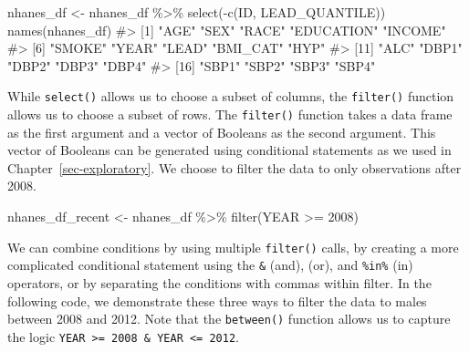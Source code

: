 \documentclass[
  letterpaper,
]{latex/krantz}
\makeatletter
\newenvironment{Shaded}{\begin{snugshade}}{\end{snugshade}}
\newcommand{\CommentTok}[1]{\textcolor[rgb]{0.37,0.37,0.37}{#1}}
\newcommand{\DecValTok}[1]{\textcolor[rgb]{0.68,0.00,0.00}{#1}}
\newcommand{\FunctionTok}[1]{\textcolor[rgb]{0.28,0.35,0.67}{#1}}
\newcommand{\NormalTok}[1]{\textcolor[rgb]{0.00,0.23,0.31}{#1}}
\newcommand{\OtherTok}[1]{\textcolor[rgb]{0.00,0.23,0.31}{#1}}
\newcommand{\SpecialCharTok}[1]{\textcolor[rgb]{0.37,0.37,0.37}{#1}}
\newenvironment{kframe}{%
\medskip{}
\setlength{\fboxsep}{.8em}
 \def\at@end@of@kframe{}%
 \ifinner\ifhmode%
  \def\at@end@of@kframe{\end{minipage}}%
  \begin{minipage}{\columnwidth}%
 \fi\fi%
 \def\FrameCommand##1{\hskip\@totalleftmargin \hskip-\fboxsep
 \colorbox{shadecolor}{##1}\hskip-\fboxsep
     \hskip-\linewidth \hskip-\@totalleftmargin \hskip\columnwidth}%
 \MakeFramed {\advance\hsize-\width
   \@totalleftmargin\z@ \linewidth\hsize
   \@setminipage}}%
 {\par\unskip\endMakeFramed%
 \at@end@of@kframe}
\renewenvironment{Shaded}{\begin{kframe}}{\end{kframe}}
\makeatother
\begin{document}
\begin{Shaded}
\begin{Highlighting}[]
\NormalTok{nhanes\_df }\OtherTok{\textless{}{-}}\NormalTok{ nhanes\_df }\SpecialCharTok{\%\textgreater{}\%} \FunctionTok{select}\NormalTok{(}\SpecialCharTok{{-}}\FunctionTok{c}\NormalTok{(ID, LEAD\_QUANTILE))}
\FunctionTok{names}\NormalTok{(nhanes\_df)}
\CommentTok{\#\textgreater{}  [1] "AGE"       "SEX"       "RACE"      "EDUCATION" "INCOME"   }
\CommentTok{\#\textgreater{}  [6] "SMOKE"     "YEAR"      "LEAD"      "BMI\_CAT"   "HYP"      }
\CommentTok{\#\textgreater{} [11] "ALC"       "DBP1"      "DBP2"      "DBP3"      "DBP4"     }
\CommentTok{\#\textgreater{} [16] "SBP1"      "SBP2"      "SBP3"      "SBP4"}
\end{Highlighting}
\end{Shaded}

While \texttt{select()} allows us to choose a subset of columns, the
\texttt{filter()} function
allows us to choose a subset of rows. The \texttt{filter()} function
takes a data frame as the first argument and a vector of Booleans as the
second argument. This vector of Booleans can be generated using
conditional statements as we used in Chapter~\ref{sec-exploratory}. We
choose to filter the data to only observations after 2008.

\begin{Shaded}
\begin{Highlighting}[]
\NormalTok{nhanes\_df\_recent }\OtherTok{\textless{}{-}}\NormalTok{ nhanes\_df }\SpecialCharTok{\%\textgreater{}\%} \FunctionTok{filter}\NormalTok{(YEAR }\SpecialCharTok{\textgreater{}=} \DecValTok{2008}\NormalTok{)}
\end{Highlighting}
\end{Shaded}

We can combine conditions by using multiple \texttt{filter()} calls, by
creating a more complicated conditional statement using the \texttt{\&}
(and), \texttt{\textbar{}} (or), and \texttt{\%in\%} (in) operators, or
by separating the conditions with commas within filter. In the following
code, we demonstrate these three ways to filter the data to males
between 2008 and 2012. Note that the
\texttt{between()}
function allows us to capture the logic
\texttt{YEAR\ \textgreater{}=\ 2008\ \&\ YEAR\ \textless{}=\ 2012}.
\end{document}

